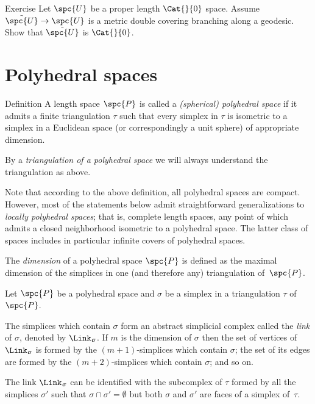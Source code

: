 \begin{thm}{Exercise}\label{ex:branching-cover} 
Let $\spc{U}$ be a proper length $\Cat{}{0}$ space.
Assume $\tilde{\spc{U}}\to \spc{U}$ is a metric  double covering branching along a geodesic.
Show that $\tilde{\spc{U}}$ is $\Cat{}{0}$.
\end{thm}

\section{Polyhedral spaces}

\begin{thm}{Definition}\label{def:poly}
A length space $\spc{P}$ is called  
a \emph{(spherical) polyhedral space} 
if it admits a finite triangulation $\tau$ 
such that every simplex in $\tau$ is isometric to a simplex in a Euclidean space (or correspondingly a unit sphere) of appropriate dimension.

By a 
\emph{triangulation of a polyhedral space} 
we will always understand the triangulation as above. 
\end{thm}

Note that according to the above definition,
all polyhedral spaces are compact.
However, 
most of the statements below admit straightforward generalizations 
to \emph{locally polyhedral spaces};
that is, complete length spaces,  
any point of which admits a closed neighborhood isometric to a polyhedral space.
The latter class of spaces includes in particular infinite covers of polyhedral spaces.

The \emph{dimension} of a polyhedral space $\spc{P}$
is defined as the maximal dimension of the simplices 
in one (and therefore any) triangulation of~$\spc{P}$.

Let $\spc{P}$ be a polyhedral space
and $\sigma$ be a simplex in a triangulation $\tau$ of~$\spc{P}$.

The simplices which contain $\sigma$
form an abstract simplicial complex called the \emph{link} of $\sigma$, 
denoted by $\Link_\sigma$.
If $m$ is  the dimension of $\sigma$
then the set of vertices of $\Link_\sigma$
is formed by the $(m+1)$-simplices which contain $\sigma$;
the set of its edges are formed by the $(m+2)$-simplices 
which contain $\sigma$; and so on.

The link $\Link_\sigma$
can be identified with the subcomplex of $\tau$ 
formed by all the simplices $\sigma'$ 
such that $\sigma\cap\sigma'=\emptyset$ 
but both $\sigma$ and $\sigma'$ are faces of a simplex of~$\tau$.

